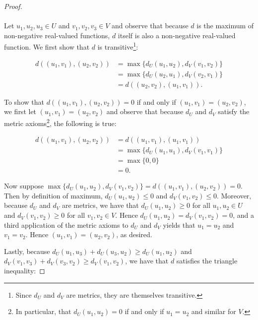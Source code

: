     \begin{proof}\ \\\\
        Let $u_1, u_2, u_3 \in U$ and $v_1, v_2, v_3 \in V$ and observe that because $d$ is the maximum of non-negative
        real-valued functions, $d$ itself is also a non-negative real-valued function. We first show that $d$ is 
        transitive\footnote{
            Since $d_U$ and $d_V$ are metrics, they are themselves transitive.
        }:

        \begin{align*}
            d((u_1, v_1), (u_2, v_2)) &= \max{\{d_U(u_1, u_2), d_V(v_1, v_2)\}} \\
                                      &= \max{\{d_U(u_2, u_1), d_V(v_2, v_1)\}} \\
                                      &= d((u_2, v_2), (u_1, v_1)).
        \end{align*}

        To show that $d((u_1, v_1), (u_2, v_2)) = 0$ if and only if $(u_1, v_1) = (u_2, v_2)$, we first let
        $(u_1, v_1) = (u_2, v_2)$ and observe that because $d_U$ and $d_V$ satisfy the metric axioms\footnote{
            In particular, that $d_U(u_1, u_2) = 0$ if and only if $u_1 = u_2$ and similar for $V$.
        }, the following
        is true:
        
        \begin{align*}
            d((u_1, v_1), (u_2, v_2)) &= d((u_1, v_1), (u_1, v_1)) \\
                                      &= \max{\{d_U(u_1, u_1), d_V(v_1, v_1)\}} \\
                                      &= \max{\{0, 0\}} \\
                                      &= 0.
        \end{align*}

        Now suppose $\max{\{d_U(u_1, u_2), d_V(v_1, v_2)\}} = d((u_1, v_1), (u_2, v_2)) = 0$. Then by definition of
        maximum, $ d_U(u_1, u_2) \le 0$ and $d_V(v_1, v_2) \le 0$. Moreover, because $d_U$ and $d_V$ are metrics, we
        have that $d_U(u_1, u_2) \ge 0$ for all $u_1, u_2 \in U$ and $d_V(v_1, v_2) \ge 0$ for all $v_1, v_2 \in V$.
        Hence $d_U(u_1, u_2) = d_V(v_1, v_2) = 0$, and a third application of the metric axioms to $d_U$ and $d_V$
        yields that $u_1 = u_2$ and $v_1 = v_2$. Hence $(u_1, v_1) = (u_2, v_2)$, as desired.

        Lastly, because $d_U(u_1, u_3) + d_U(u_3, u_2) \ge d_U(u_1, u_2)$ and 
        $d_V(v_1, v_3) + d_V(v_3, v_2) \ge d_V(v_1, v_2)$, we have that $d$ satisfies the triangle inequality:


\end{proof}

